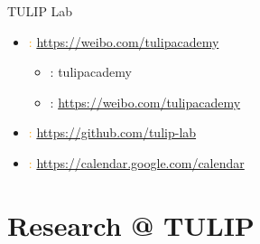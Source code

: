 \documentclass[
 size=14pt,
 paper=smartboard,  %
 mode=present, 		%
 display=slides, 	%
 style=tuliplab,  	%
 pauseslide,
 fleqn,leqno]{powerdot}{}
\begin{document}
\begin{slide}{TULIP Lab}
\begin{itemize}
  \item \textcolor{orange}{\faHome:} \href{https://weibo.com/tulipacademy}{https://weibo.com/tulipacademy}
  \begin{itemize}
    \item \faTwitter: tulipacademy
    \item \faWeibo: \href{https://weibo.com/tulipacademy}{https://weibo.com/tulipacademy}
  \end{itemize}
  \item \textcolor{orange}{\faGithub:} \href{https://github.com/tulip-lab}{https://github.com/tulip-lab}
  \item \textcolor{orange}{\faCalendar:}
  \href{https://calendar.google.com/calendar/embed?src=1trnk46p4gae8ev410ku57sba4\%40group.calendar.google.com\&ctz=Australia\%2FSydney
}{https://calendar.google.com/calendar}
\end{itemize}
\end{slide}


\section{Research @ TULIP}
\end{document}
